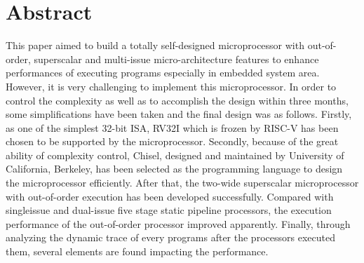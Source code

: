 \chapter*{Abstract}%

This paper aimed to build a totally self-designed microprocessor with out-of-order, superscalar and multi-issue micro-architecture features to enhance performances of executing programs especially in embedded system area. However, it is very challenging to implement this microprocessor. In order to control the complexity as well as to accomplish the design within three months, some simplifications have been taken and the final design was as follows. Firstly, as one of the simplest 32-bit ISA, RV32I which is frozen by RISC-V has been chosen to be supported by the microprocessor. Secondly, because of the great ability of complexity control, Chisel, designed and maintained by University of California, Berkeley, has been selected as the programming language to design the microprocessor efficiently. After that, the two-wide superscalar microprocessor with out-of-order execution has been developed successfully. Compared with singleissue and dual-issue five stage static pipeline processors, the execution performance of the out-of-order processor improved apparently. Finally, through analyzing the dynamic trace of every programs after the processors executed them, several elements are found impacting the performance.

